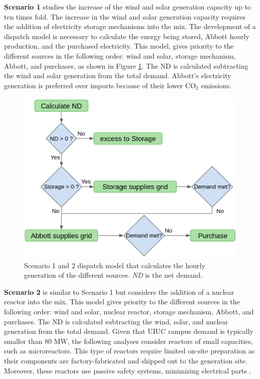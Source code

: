 \documentclass{anstrans}
\begin{document}
\textbf{Scenario 1} studies the increase of the wind and solar generation capacity up to ten times fold.
The increase in the wind and solar generation capacity requires the addition of electricity storage mechanisms into the mix.
The development of a dispatch model is necessary to calculate the energy being stored, Abbott hourly production, and the purchased electricity.
This model, gives priority to the different sources in the following order: wind and solar, storage mechanism, Abbott, and purchases, as shown in Figure \ref{fig:dispatch-model}.
The \gls{ND} is calculated subtracting the wind and solar generation from the total demand.
Abbott’s electricity generation is preferred over imports because of their lower CO$_2$ emissions.

\begin{figure}[htbp!] %
    \centering
    \includegraphics[width=0.90\linewidth]{figures/dispatch-model}
    \hfill
    \caption{Scenario 1 and 2 dispatch model that calculates the hourly generation of the different sources. \textit{ND} is the net demand.}
    \label{fig:dispatch-model}
\end{figure}

\textbf{Scenario 2} is similar to Scenario 1 but considers the addition of a nuclear reactor into the mix.
This model gives priority to the different sources in the following order: wind and solar, nuclear reactor, storage mechanism, Abbott, and purchases.
The \gls{ND} is calculated subtracting the wind, solar, and nuclear generation from the total demand.
Given that UIUC campus demand is typically smaller than 80 MW, the following analyses consider reactors of small capacities, such as microreactors.
This type of reactors require limited on-site preparation as their components are factory-fabricated and shipped out to the generation site.
Moreover, these reactors use passive safety systems, minimizing electrical parts \cite{us-doe_ultimate_2019}.
\end{document}
